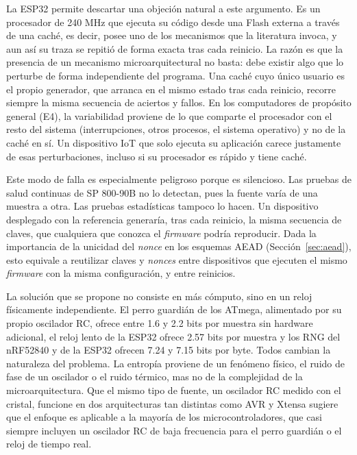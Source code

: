 La ESP32 permite descartar una objeción natural a este argumento. Es un procesador de 240 MHz que ejecuta su código desde una Flash externa a través de una caché, es decir, posee uno de los mecanismos que la literatura invoca, y aun así su traza se repitió de forma exacta tras cada reinicio. La razón es que la presencia de un mecanismo microarquitectural no basta: debe existir algo que lo perturbe de forma independiente del programa. Una caché cuyo único usuario es el propio generador, que arranca en el mismo estado tras cada reinicio, recorre siempre la misma secuencia de aciertos y fallos. En los computadores de propósito general (E4), la variabilidad proviene de lo que comparte el procesador con el resto del sistema (interrupciones, otros procesos, el sistema operativo) y no de la caché en sí. Un dispositivo IoT que solo ejecuta su aplicación carece justamente de esas perturbaciones, incluso si su procesador es rápido y tiene caché.

Este modo de falla es especialmente peligroso porque es silencioso. Las pruebas de salud continuas de SP 800-90B no lo detectan, pues la fuente varía de una muestra a otra. Las pruebas estadísticas tampoco lo hacen. Un dispositivo desplegado con la referencia generaría, tras cada reinicio, la misma secuencia de claves, que cualquiera que conozca el \textit{firmware} podría reproducir. Dada la importancia de la unicidad del \textit{nonce} en los esquemas AEAD (Sección~\ref{sec:aead}), esto equivale a reutilizar claves y \textit{nonces} entre dispositivos que ejecuten el mismo \textit{firmware} con la misma configuración, y entre reinicios.

La solución que se propone no consiste en más cómputo, sino en un reloj físicamente independiente. El perro guardián de los ATmega, alimentado por su propio oscilador RC, ofrece entre 1.6 y 2.2 bits por muestra sin hardware adicional, el reloj lento de la ESP32 ofrece 2.57 bits por muestra y los RNG del nRF52840 y de la ESP32 ofrecen 7.24 y 7.15 bits por byte. Todos cambian la naturaleza del problema. La entropía proviene de un fenómeno físico, el ruido de fase de un oscilador o el ruido térmico, mas no de la complejidad de la microarquitectura. Que el mismo tipo de fuente, un oscilador RC medido con el cristal, funcione en dos arquitecturas tan distintas como AVR y Xtensa sugiere que el enfoque es aplicable a la mayoría de los microcontroladores, que casi siempre incluyen un oscilador RC de baja frecuencia para el perro guardián o el reloj de tiempo real.

